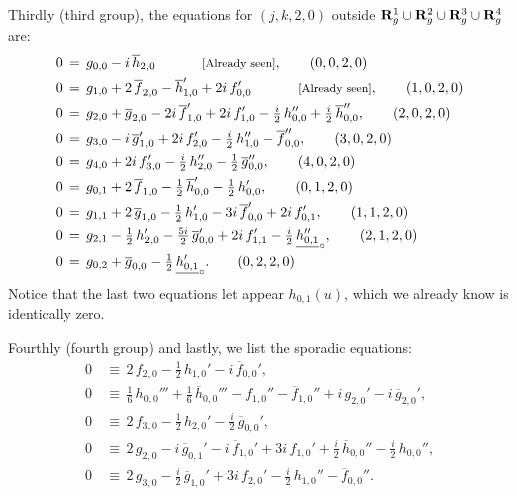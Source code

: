 \documentclass[12pt,twoside,leqno,openany]{amsart}
\begin{document}
Thirdly (third group), the equations for $(j,k,2,0)$ outside 
${\bf R}_g^1 \cup {\bf R}_g^2 \cup {\bf R}_g^3 \cup 
{\bf R}_g^4$ are:
\leqnomode{}
\begin{align}
0
&
\,=\,
g_{0,0}
-
i\,\overline{h}_{2,0}
\ \ \ \ \ \ \ \ \ \ 
\text{\footnotesize[Already seen]},
\tag{$0,0,2,0$}
\\
0
&
\,=\,
g_{1,0}
+
2\,\overline{f}_{2,0}
-
\overline{h}_{1,0}'
+
2i\,f_{0,0}'
\ \ \ \ \ \ \ \ \ \ 
\text{\footnotesize[Already seen]},
\tag{$1,0,2,0$}
\\
0
&
\,=\,
g_{2,0}
+
\overline{g}_{2,0}
-
2i\,\overline{f}_{1,0}'
+
2i\,f_{1,0}'
-
\tfrac{i}{2}\,h_{0,0}''
+
\tfrac{i}{2}\,
\overline{h}_{0,0}'',
\tag{$2,0,2,0$}
\\
0
&
\,=\,
g_{3,0}
-
i\,\overline{g}_{1,0}'
+
2i\,f_{2,0}'
-
\tfrac{i}{2}\,h_{1,0}''
-
\overline{f}_{0,0}'',
\tag{$3,0,2,0$}
\\
0
&
\,=\,
g_{4,0}
+
2i\,f_{3,0}'
-
\tfrac{i}{2}\,h_{2,0}''
-
\tfrac{1}{2}\,\overline{g}_{0,0}'',
\tag{$4,0,2,0$}
\\
0
&
\,=\,
g_{0,1}
+
2\,\overline{f}_{1,0}
-
\tfrac{1}{2}\,
\overline{h}_{0,0}'
-
\tfrac{1}{2}\,
h_{0,0}',
\tag{$0,1,2,0$}
\\
0
&
\,=\,
g_{1,1}
+
2\,\overline{g}_{1,0}
-
\tfrac{1}{2}\,
h_{1,0}'
-
3i\,\overline{f}_{0,0}'
+
2i\,f_{0,1}',
\tag{$1,1,2,0$}
\\
0
&
\,=\,
g_{2,1}
-
\tfrac{1}{2}\,h_{2,0}'
-
\tfrac{5i}{2}\,
\overline{g}_{0,0}'
+
2i\,f_{1,1}'
-
\tfrac{i}{2}\,\zero{h_{0,1}''},
\tag{$2,1,2,0$}
\\
0
&
\,=\,
g_{0,2}
+
\overline{g}_{0,0}
-
\tfrac{1}{2}\,\zero{h_{0,1}'}.
\tag{$0,2,2,0$}
\end{align}
Notice that the last two equations let appear
$h_{0,1}(u)$, which we already know is identically zero.

Fourthly (fourth group) and lastly, we list the sporadic equations:
\leqnomode{}
\begin{align}
0
&
\,\equiv\,
2\,f_{2,0}
-
\tfrac{1}{2}\,
h_{1,0}'
-
i\,\overline{f}_{0,0}',
\tag{$3,0,0,1$}
\\
0
&
\,\equiv\,
\tfrac{1}{6}\,
h_{0,0}'''
+
\tfrac{1}{6}\,
\overline{h}_{0,0}'''
-
f_{1,0}''
-
\overline{f}_{1,0}''
+
i\,g_{2,0}'
-
i\,\overline{g}_{2,0}',
\tag{$3,0,3,0$}
\\
0
&
\,\equiv\,
2\,f_{3,0}
-
\tfrac{1}{2}\,
h_{2,0}'
-
\tfrac{i}{2}\,
\overline{g}_{0,0}',
\tag{$4,0,0,1$}
\\
0
&
\,\equiv\,
2\,g_{2,0}
-
i\,\overline{g}_{0,1}'
-
i\,\overline{f}_{1,0}'
+
3i\,f_{1,0}'
+
\tfrac{i}{2}\,\overline{h}_{0,0}''
-
\tfrac{i}{2}\,h_{0,0}'',
\tag{$3,0,1,1$}
\\
0
&
\,\equiv\,
2\,g_{3,0}
-
\tfrac{i}{2}\,
\overline{g}_{1,0}'
+
3i\,f_{2,0}'
-
\tfrac{i}{2}\,h_{1,0}''
-
\overline{f}_{0,0}''.
\tag{$4,0,1,1$}
\end{align}
\end{document}
